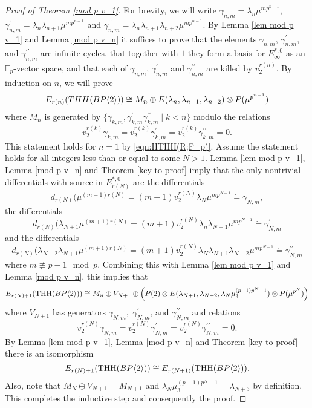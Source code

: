 \begin{proof}[Proof of Theorem \ref{mod p v_1}]
For brevity, we will write $\gamma_{n,m}=\lambda_n\mu^{mp^{n-1}}$, $\gamma_{n,m}^{\prime}=\lambda_n\lambda_{n+1}\mu^{mp^{n-1}}$ and $\gamma_{n,m}^{\prime\prime}=\lambda_n\lambda_{n+1}\lambda_{n+2}\mu^{mp^{n-1}}$. 
By Lemma \ref{lem mod p v_1} and Lemma \ref{mod p v_n} it suffices to prove that the elements $\gamma_{n,m}$, $\gamma_{n,m}^{\prime}$, and $\gamma_{n,m}^{\prime\prime}$ are infinite cycles, that together with $1$ they form a basis for $E_{\infty}^{*,0}$ as an $\mathbb{F}_p$-vector space, and that each of $\gamma_{n,m}$, $\gamma_{n,m}^{\prime}$ and $\gamma_{n,m}^{\prime\prime}$ are killed by $v_2^{r(n)}$. By induction on $n$, we will prove
\[ E_{r(n)}(THH(BP\langle 2 \rangle))\cong M_n\oplus E(\lambda_n,\lambda_{n+1},\lambda_{n+2})\otimes P(\mu^{p^{n-1}})\]
where $M_n$ is generated by $\{\gamma_{k,m}, \gamma_{k,m}^{\prime}\gamma_{k,m}^{\prime\prime}\mid k<n\}$ modulo the relations 
\[v_2^{r(k)}\gamma_{k,m}=v_2^{r(k)}\gamma_{k,m}^{\prime}=v_2^{r(k)}\gamma_{k,m}^{\prime\prime}=0. \]
This statement holds for $n=1$ by \eqref{eqn:HTHH(R;F_p)}. Assume the statement holds for all integers less than or equal to some $N>1$. Lemma \ref{lem mod p v_1}, Lemma \ref{mod p v_n} and Theorem \ref{key to proof} imply that the only nontrivial differentials with source in $E_{r(N)}^{*,0}$ are the differentials
\[ d_{r(N)}(\mu^{(m+1)r(N)}=(m+1)v_2^{r(N)}\lambda_N\mu^{mp^{N-1}}\dot{=}\gamma_{N,m},\]
the differentials 
\[ d_{r(N)}(\lambda_{N+1}\mu^{(m+1)r(N)}=(m+1)v_2^{r(N)}\lambda_n\lambda_{N+1}\mu^{mp^{N-1}}\dot{=}\gamma_{N,m}^{\prime}\]
and the differentials
\[ d_{r(N)}(\lambda_{N+2}\lambda_{N+1}\mu^{(m+1)r(N)}=(m+1)v_2^{r(N)}\lambda_N\lambda_{N+1}\lambda_{N+2}\mu^{mp^{N-1}}\dot{=}\gamma_{N,m}^{\prime \prime}\]
where $m\not \equiv p-1 \mod{p}$. Combining this with Lemma \ref{lem mod p v_1} and Lemma \ref{mod p v_n}, this implies that
\[ E_{r(N)+1}(\operatorname{THH}(BP\langle 2 \rangle))\cong M_n\oplus V_{N+1}\oplus \left ( P(2)\otimes E(\lambda_{N+1},\lambda_{N+2},\lambda_N\mu_3^{(p-1)p^N-1} )\otimes P(\mu^{p^N})\right )\]
where $V_{N+1}$ has generators $\gamma_{N,m},$ $\gamma_{N,m}^{\prime}$, and $\gamma_{N,m}^{\prime\prime}$ and relations 
\[ v_2^{r(N)}\gamma_{N,m}=v_2^{r(N)}\gamma_{N,m}^{\prime}=v_2^{r(N)}\gamma_{N,m}^{\prime\prime}=0.\]
By Lemma \ref{lem mod p v_1}, Lemma \ref{mod p v_n} and Theorem \ref{key to proof} there is an isomorphism
\[ E_{r(N)+1}(\operatorname{THH}(BP\langle 2 \rangle))\cong E_{r(N+1)}(\operatorname{THH}(BP\langle 2 \rangle)).\] 
Also, note that $M_N\oplus V_{N+1}=M_{N+1}$ and $\lambda_N\mu_3^{(p-1)p^N-1}=\lambda_{N+3}$ by definition. This completes the inductive step and consequently the proof.
\end{proof}



